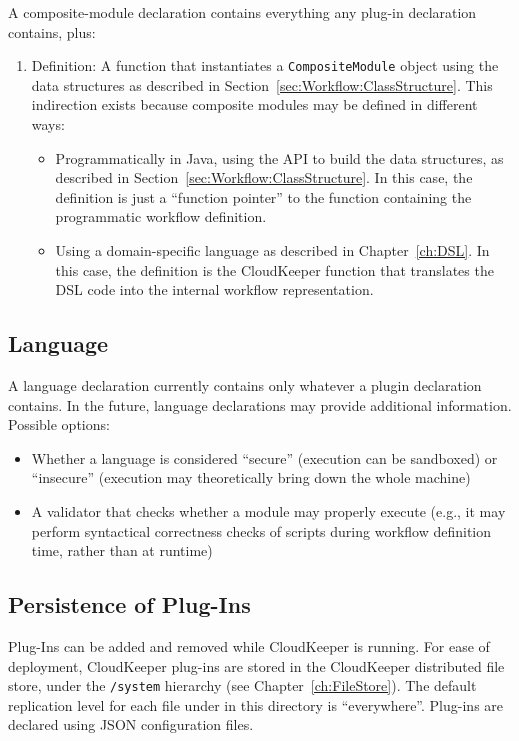 A composite-module declaration contains everything any plug-in declaration contains, plus:
%
\begin{enumerate}
	\item Definition: A function that instantiates a \texttt{CompositeModule} object using the data structures as described in Section~\ref{sec:Workflow:ClassStructure}. This indirection exists because composite modules may be defined in different ways:
		\begin{itemize}
			\item Programmatically in Java, using the API to build the data structures, as described in Section~\ref{sec:Workflow:ClassStructure}. In this case, the definition is just a ``function pointer'' to the function containing the programmatic workflow definition.
			\item Using a domain-specific language as described in Chapter~\ref{ch:DSL}. In this case, the definition is the CloudKeeper function that translates the DSL code into the internal workflow representation.
		\end{itemize}
\end{enumerate}

\subsection{Language}

A language declaration currently contains only whatever a plugin declaration contains. In the future, language declarations may provide additional information. Possible options:
\begin{itemize}
	\item Whether a language is considered ``secure'' (execution can be sandboxed) or ``insecure'' (execution may theoretically bring down the whole machine)
	\item A validator that checks whether a module may properly execute (e.g., it may perform syntactical correctness checks of scripts during workflow definition time, rather than at runtime)
\end{itemize}

\subsection{Persistence of Plug-Ins}

Plug-Ins can be added and removed while CloudKeeper is running. For ease of deployment, CloudKeeper plug-ins are stored in the CloudKeeper distributed file store, under the \texttt{/system} hierarchy (see Chapter~\ref{ch:FileStore}). The default replication level for each file under in this directory is ``everywhere''.
Plug-ins are declared using JSON configuration files.

